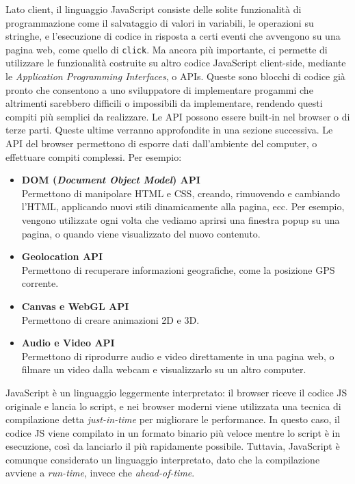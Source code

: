 Lato client, il linguaggio JavaScript consiste delle solite funzionalità di programmazione come il salvataggio di valori in variabili, le operazioni su stringhe, e l'esecuzione di codice in risposta a certi eventi che avvengono su una pagina web, come quello di \Verb_click_. Ma ancora più importante, ci permette di utilizzare le funzionalità costruite su altro codice JavaScript client-side, mediante le \textit{Application Programming Interfaces}, o APIs. Queste sono blocchi di codice già pronto che consentono a uno sviluppatore di implementare progammi che altrimenti sarebbero difficili o impossibili da implementare, rendendo questi compiti più semplici da realizzare. Le API possono essere built-in nel browser o di terze parti. Queste ultime verranno approfondite in una sezione successiva. Le API del browser permettono di esporre dati dall'ambiente del computer, o effettuare compiti complessi. Per esempio:
\begin{itemize}
    \item \textbf{DOM (\textit{Document Object Model}) API}\\
    Permettono di manipolare HTML e CSS, creando, rimuovendo e cambiando l'HTML, applicando nuovi stili dinamicamente alla pagina, ecc. Per esempio, vengono utilizzate ogni volta che vediamo aprirsi una finestra popup su una pagina, o quando viene visualizzato del nuovo contenuto.
    \item \textbf{Geolocation API}\\
    Permettono di recuperare informazioni geografiche, come la posizione GPS corrente.
    \item \textbf{Canvas e WebGL API}\\
    Permettono di creare animazioni 2D e 3D.
    \item \textbf{Audio e Video API}\\
    Permettono di riprodurre audio e video direttamente in una pagina web, o filmare un video dalla webcam e visualizzarlo su un altro computer.
\end{itemize}

JavaScript è un linguaggio leggermente interpretato: il browser riceve il codice JS originale e lancia lo script, e nei browser moderni viene utilizzata una tecnica di compilazione detta \textit{just-in-time} per migliorare le performance. In questo caso, il codice JS viene compilato in un formato binario più veloce mentre lo script è in esecuzione, così da lanciarlo il più rapidamente possibile. Tuttavia, JavaScript è comunque considerato un linguaggio interpretato, dato che la compilazione avviene a \textit{run-time}, invece che \textit{ahead-of-time}.


